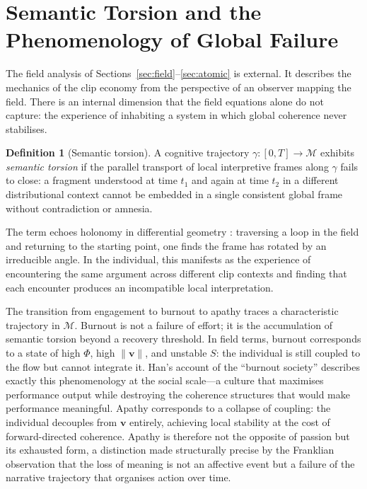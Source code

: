 \documentclass{amsart}
\theoremstyle{plain}
\theoremstyle{definition}
\newtheorem{definition}[theorem]{Definition}
\theoremstyle{remark}
\newcommand{\scalar}{\Phi}
\newcommand{\vfield}{\mathbf{v}}
\newcommand{\entr}{S}
\newcommand{\Man}{\mathcal{M}}
\begin{document}
\section{Semantic Torsion and the Phenomenology of Global Failure}
\label{sec:torsion}

The field analysis of Sections~\ref{sec:field}--\ref{sec:atomic} is external.  It
describes the mechanics of the clip economy from the perspective of an observer
mapping the field.  There is an internal dimension that the field equations alone
do not capture: the experience of inhabiting a system in which global coherence
never stabilises.

\begin{definition}[Semantic torsion]
  \label{def:torsion}
  A cognitive trajectory $\gamma\colon [0,T] \to \Man$ exhibits \emph{semantic
  torsion} if the parallel transport of local interpretive frames along $\gamma$
  fails to close: a fragment understood at time $t_1$ and again at time $t_2$ in a
  different distributional context cannot be embedded in a single consistent global
  frame without contradiction or amnesia.
\end{definition}

The term echoes holonomy in differential geometry \cite{munkres2000}: traversing a
loop in the field and returning to the starting point, one finds the frame has
rotated by an irreducible angle.  In the individual, this manifests as the
experience of encountering the same argument across different clip contexts and
finding that each encounter produces an incompatible local interpretation.

The transition from engagement to burnout to apathy traces a characteristic
trajectory in $\Man$.  Burnout is not a failure of effort; it is the accumulation
of semantic torsion beyond a recovery threshold.  In field terms, burnout
corresponds to a state of high $\scalar$, high $\|\vfield\|$, and unstable $\entr$:
the individual is still coupled to the flow but cannot integrate it.  Han's account
of the ``burnout society'' \cite{han2015} describes exactly this phenomenology at
the social scale---a culture that maximises performance output while destroying the
coherence structures that would make performance meaningful.  Apathy corresponds to
a collapse of coupling: the individual decouples from $\vfield$ entirely, achieving
local stability at the cost of forward-directed coherence.  Apathy is therefore not
the opposite of passion but its exhausted form, a distinction made structurally
precise by the Franklian observation \cite{frankl2006} that the loss of meaning is
not an affective event but a failure of the narrative trajectory that organises
action over time.
\end{document}
